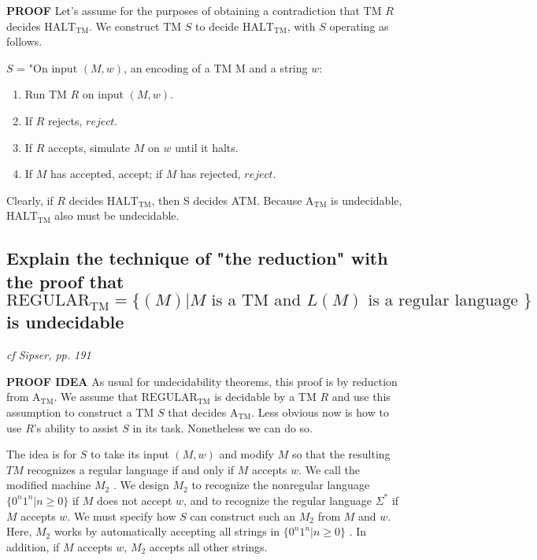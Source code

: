 \documentclass[main.tex]{subfiles}
\begin{document}
\par\textbf{PROOF}
Let's assume for the purposes of obtaining a contradiction that TM
$R$ decides $\text{HALT}_\text{TM}$. We construct TM $S$ to decide $\text{HALT}_\text{TM}$, with $S$ operating as follows.

$S$ = "On input $(M, w)$, an encoding of a TM M and a string $w$:
\begin{enumerate}
    \item Run TM $R$ on input $(M, w)$.
    \item If $R$ rejects, $reject$.
    \item If $R$ accepts, simulate $M$ on $w$ until it halts.
    \item If $M$ has accepted, accept; if $M$ has rejected, $reject$.
\end{enumerate}{}

Clearly, if $R$ decides $\text{HALT}_\text{TM}$, then S decides ATM. Because $\text{A}_\text{TM}$ is undecidable, $\text{HALT}_\text{TM}$ also must be undecidable.







\subsection{Explain the technique of "the reduction" with the proof that $\text{REGULAR}_\text{TM} = \{(M) | M \text{ is a TM and } L(M) \text{ is a regular language } \}$ is undecidable}
\emph{cf Sipser, pp. 191}

\par\textbf{PROOF IDEA}
As usual for undecidability theorems, this proof is by reduction
from $\text{A}_\text{TM}$. We assume that $\text{REGULAR}_\text{TM}$ is decidable by a TM $R$ and use this assumption to construct a TM $S$ that decides $\text{A}_\text{TM}$. Less obvious now is how to use $R$'s ability to assist $S$ in its task. Nonetheless we can do so.
\par The idea is for $S$ to take its input $(M, w)$ and modify $M$ so that the resulting $TM$ recognizes a regular language if and only if $M$ accepts $w$. We call the modified machine $M_2$ . We design $M_2$ to recognize the nonregular language
$\{0^n1^n | n \geq 0 \}$ if $M$ does not accept $w$, and to recognize the regular language $\Sigma^*$ if $M$ accepts $w$. We must specify how $S$ can construct such an $M_2$ from $M$ and $w$. Here, $M_2$ works by automatically accepting all strings in $\{0^n1^n | n \geq 0 \}$ . In addition, if $M$ accepts $w$, $M_2$ accepts all other strings.
\end{document}
